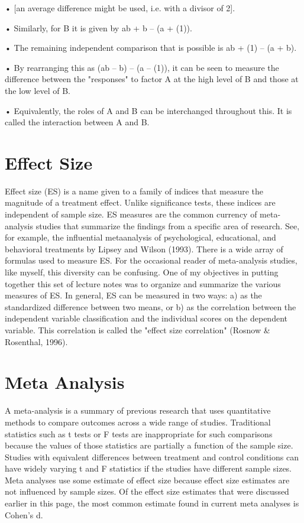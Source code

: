 \documentclass[]{article}
\begin{document}
•
[an average difference might be used, i.e. with a divisor of 2]. 


•
Similarly, for B it is given by ab + b – (a + (1)).


•
The remaining independent comparison that is possible is ab + (1) – (a + b). 


•
By rearranging this as (ab – b) – (a – (1)), it can be seen to measure the difference between the "responses" to factor A at the high level of B and those at the low level of B. 


•
Equivalently, the roles of A and B can be interchanged throughout this. It is called the interaction between A and B.

\newpage
\section{Effect Size}
Effect size (ES) is a name given to a family of indices that measure the magnitude of
a treatment effect. Unlike significance tests, these indices are independent of sample
size. ES measures are the common currency of meta-analysis studies that summarize
the findings from a specific area of research. See, for example, the influential metaanalysis
of psychological, educational, and behavioral treatments by Lipsey and
Wilson (1993).
There is a wide array of formulas used to measure ES. For the occasional reader of
meta-analysis studies, like myself, this diversity can be confusing. One of my
objectives in putting together this set of lecture notes was to organize and summarize
the various measures of ES.
In general, ES can be measured in two ways:
a) as the standardized difference between two means, or
b) as the correlation between the independent variable classification and the
individual scores on the dependent variable. This correlation is called the "effect size
correlation" (Rosnow & Rosenthal, 1996).

\section{Meta Analysis}

A meta-analysis is a summary of previous research that uses quantitative methods to
compare outcomes across a wide range of studies. Traditional statistics such as t tests
or F tests are inappropriate for such comparisons because the values of those
statistics are partially a function of the sample size. Studies with equivalent
differences between treatment and control conditions can have widely varying t and
F statistics if the studies have different sample sizes. Meta analyses use some
estimate of effect size because effect size estimates are not influenced by sample
sizes. Of the effect size estimates that were discussed earlier in this page, the most
common estimate found in current meta analyses is Cohen's d.
\end{document}
